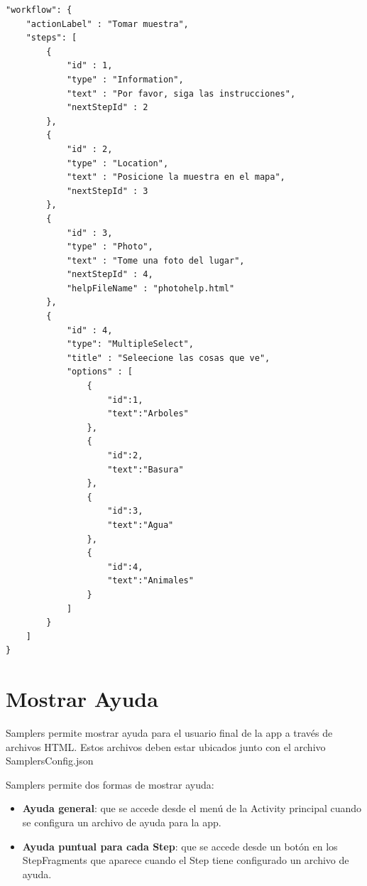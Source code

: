 \begin{lstlisting}[language=XML, frame=tlbr, caption=Ejemplo del objeto workflow.]	
"workflow": {
	"actionLabel" : "Tomar muestra",
	"steps": [
		{
			"id" : 1,
			"type" : "Information",
			"text" : "Por favor, siga las instrucciones",
			"nextStepId" : 2
		},
		{
			"id" : 2,
			"type" : "Location",
			"text" : "Posicione la muestra en el mapa",
			"nextStepId" : 3
		},
		{
			"id" : 3,
			"type" : "Photo",
			"text" : "Tome una foto del lugar",
			"nextStepId" : 4,
			"helpFileName" : "photohelp.html"
		},      
		{
			"id" : 4,
			"type": "MultipleSelect",
			"title" : "Seleecione las cosas que ve",
			"options" : [
				{
					"id":1,
					"text":"Arboles"
				},
				{
					"id":2,
					"text":"Basura"
				},
				{
					"id":3,
					"text":"Agua"
				},
				{
					"id":4,
					"text":"Animales"
				}          
			]
		}
	]
}
\end{lstlisting}



\section{Mostrar Ayuda} \label{sec:mostrar_ayuda}
Samplers permite mostrar ayuda para el usuario final de la app a través de archivos HTML. Estos archivos deben estar ubicados junto con el archivo SamplersConfig.json

Samplers permite dos formas de mostrar ayuda:

\begin{itemize}

	\item \textbf{Ayuda general}: que se accede desde el menú de la Activity principal cuando se configura un archivo de ayuda para la app.
		
	\item \textbf{Ayuda puntual para cada Step}: que se accede desde un botón en los StepFragments que aparece cuando el Step tiene configurado un archivo de ayuda.

\end{itemize}


